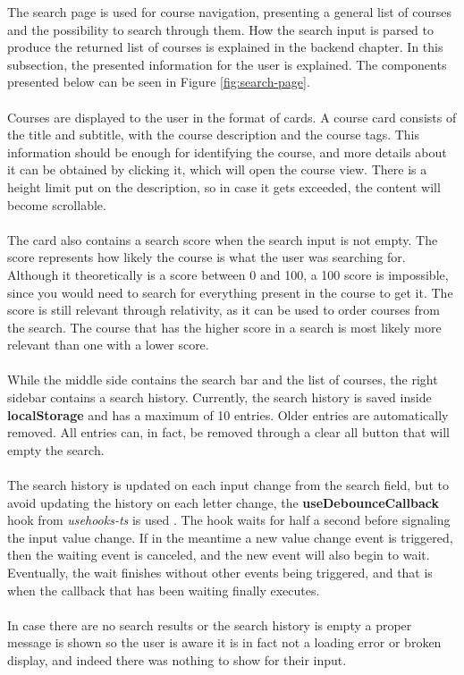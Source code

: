 \noindent The search page is used for course navigation, presenting a general list of courses and the possibility to search through them. How the search input is parsed to produce the returned list of courses is explained in the backend chapter. In this subsection, the presented information for the user is explained. The components presented below can be seen in Figure \ref{fig:search-page}.
\\\\
\noindent Courses are displayed to the user in the format of cards. A course card consists of the title and subtitle, with the course description and the course tags. This information should be enough for identifying the course, and more details about it can be obtained by clicking it, which will open the course view. There is a height limit put on the description, so in case it gets exceeded, the content will become scrollable.
\\\\
\noindent The card also contains a search score when the search input is not empty. The score represents how likely the course is what the user was searching for. Although it theoretically is a score between 0 and 100, a 100 score is impossible, since you would need to search for everything present in the course to get it. The score is still relevant through relativity, as it can be used to order courses from the search. The course that has the higher score in a search is most likely more relevant than one with a lower score.
\\\\
\noindent While the middle side contains the search bar and the list of courses, the right sidebar contains a search history. Currently, the search history is saved inside \textbf{localStorage} and has a maximum of 10 entries. Older entries are automatically removed. All entries can, in fact, be removed through a clear all button that will empty the search.
\\\\
\noindent The search history is updated on each input change from the search field, but to avoid updating the history on each letter change, the \textbf{useDebounceCallback} hook from \textit{usehooks-ts} is used \cite{usehooks-ts}. The hook waits for half a second before signaling the input value change. If in the meantime a new value change event is triggered, then the waiting event is canceled, and the new event will also begin to wait. Eventually, the wait finishes without other events being triggered, and that is when the callback that has been waiting finally executes.
\\\\
\noindent In case there are no search results or the search history is empty a proper message is shown so the user is aware it is in fact not a loading error or broken display, and indeed there was nothing to show for their input. 

